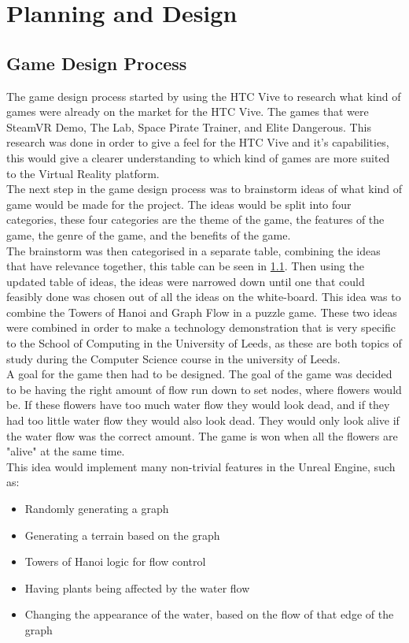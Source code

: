 \chapter{Planning and Design}
\label{chapter5}

\section{Game Design Process}
	The game design process started by using the HTC Vive to research what kind of games were already on the market for the HTC Vive. The games that were SteamVR Demo\cite{steamvr}, The Lab\cite{thelab}, Space Pirate Trainer\cite{spacepiratetrainer}, and Elite Dangerous\cite{elitedangerous}. This research was done in order to give a feel for the HTC Vive and it's capabilities, this would give a clearer understanding to which kind of games are more suited to the Virtual Reality platform.\\
The next step in the game design process was to brainstorm ideas of what kind of game would be made for the project. The ideas would be split into four categories, these four categories are the theme of the game, the features of the game, the genre of the game, and the benefits of the game.\\
The brainstorm was then categorised in a separate table, combining the ideas that have relevance together, this table can be seen in \ref{}.
Then using the updated table of ideas, the ideas were narrowed down until one that could feasibly done was chosen out of all the ideas on the white-board. This idea was to combine the Towers of Hanoi and Graph Flow in a puzzle game. These two ideas were combined in order to make a technology demonstration that is very specific to the School of Computing in the University of Leeds, as these are both topics of study during the Computer Science course in the university of Leeds.\\
A goal for the game then had to be designed. The goal of the game was decided to be having the right amount of flow run down to set nodes, where flowers would be. If these flowers have too much water flow they would look dead, and if they had too little water flow they would also look dead. They would only look alive if the water flow was the correct amount. The game is won when all the flowers are "alive" at the same time.\\
	This idea would implement many non-trivial features in the Unreal Engine, such as:
	\begin{itemize}
		\item Randomly generating a graph
		\item Generating a terrain based on the graph
		\item Towers of Hanoi logic for flow control
		\item Having plants being affected by the water flow
		\item Changing the appearance of the water, based on the flow of that edge of the graph
	\end{itemize}



